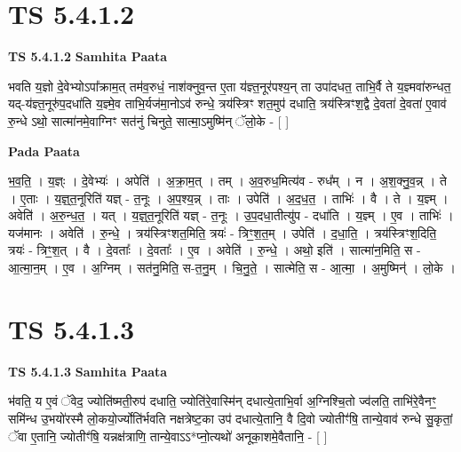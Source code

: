 \documentclass[17pt]{extarticle}
\begin{document}
\section{ TS 5.4.1.2 }

\textbf{TS 5.4.1.2 } \newline
\textbf{Samhita Paata} \newline

भवति य॒ज्ञो दे॒वेभ्योऽपा᳚क्राम॒त् तम॑व॒रुधं॒ नाश॑क्नुव॒न्त ए॒ता य॑ज्ञ्त॒नूर॑पश्य॒न् ता उपा॑दधत॒ ताभि॒र्वै ते य॒ज्ञ्मवा॑रुन्धत॒ यद्-य॑ज्ञ्त॒नूरु॑प॒दधा॑ति य॒ज्ञ्मे॒व ताभि॒र्यज॑मा॒नोऽव॑ रुन्धे॒ त्रय॑स्त्रिꣳ शत॒मुप॑ दधाति॒ त्रय॑स्त्रिꣳश॒द्वै दे॒वता॑ दे॒वता॑ ए॒वाव॑ रु॒न्धे ऽथो॒ सात्मा॑नमे॒वाग्निꣳ सत॑नुं चिनुते॒ सात्मा॒ऽमुष्मि॑न् ॅलो॒के - [  ] \newline

\textbf{Pada Paata} \newline

भ॒व॒ति॒ । य॒ज्ञ्ः । दे॒वेभ्यः॑ । अपेति॑ । अ॒क्रा॒म॒त् । तम् । अ॒व॒रुध॒मित्य॑व - रुध᳚म् । न । अ॒श॒क्नु॒व॒न्न् । ते । ए॒ताः । य॒ज्ञ्॒त॒नूरिति॑ यज्ञ् - त॒नूः । अ॒प॒श्य॒न्न् । ताः । उपेति॑ । अ॒द॒ध॒त॒ । ताभिः॑ । वै । ते । य॒ज्ञ्म् । अवेति॑ । अ॒रु॒न्ध॒त॒ । यत् । य॒ज्ञ्॒त॒नूरिति॑ यज्ञ् - त॒नूः । उ॒प॒दधा॒तीत्यु॑प - दधा॑ति । य॒ज्ञ्म् । ए॒व । ताभिः॑ । यज॑मानः । अवेति॑ । रु॒न्धे॒ । त्रय॑स्त्रिꣳशत॒मिति॒ त्रयः॑ - त्रिꣳ॒॒श॒त॒म् । उपेति॑ । द॒धा॒ति॒ । त्रय॑स्त्रिꣳश॒दिति॒ त्रयः॑ - त्रिꣳ॒॒श॒त् । वै । दे॒वताः᳚ । दे॒वताः᳚ । ए॒व । अवेति॑ । रु॒न्धे॒ । अथो॒ इति॑ । सात्मा॑न॒मिति॒ स - आ॒त्मा॒न॒म् । ए॒व । अ॒ग्निम् । सत॑नु॒मिति॒ स-त॒नु॒म् । चि॒नु॒ते॒ । सात्मेति॒ स - आ॒त्मा॒ । अ॒मुष्मिन्॑ । लो॒के ।  \newline





\section{ TS 5.4.1.3 }

\textbf{TS 5.4.1.3 } \newline
\textbf{Samhita Paata} \newline

भ॑वति॒ य ए॒वं ॅवेद॒ ज्योति॑ष्मती॒रुप॑ दधाति॒ ज्योति॑रे॒वास्मि॑न् दधात्ये॒ताभि॒र्वा अ॒ग्निश्चि॒तो ज्व॑लति॒ ताभि॑रे॒वैनꣳ॒॒ समि॑न्ध उ॒भयो॑रस्मै लो॒कयो॒र्ज्योति॑र्भवति नक्षत्रेष्ट॒का उप॑ दधात्ये॒तानि॒ वै दि॒वो ज्योतीꣳ॑षि॒ तान्ये॒वाव॑ रुन्धे सु॒कृतां॒ ॅवा ए॒तानि॒ ज्योतीꣳ॑षि॒ यन्नक्ष॑त्राणि॒ तान्ये॒वाऽऽ*प्नो॒त्यथो॑ अनूका॒शमे॒वैतानि॒ - [  ] \newline
\end{document}
